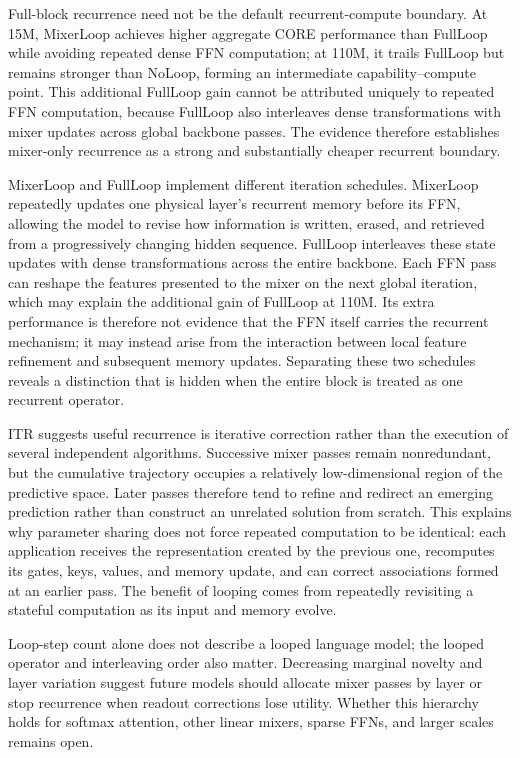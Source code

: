 \documentclass{article}
\begin{document}
Full-block recurrence need not be the default recurrent-compute boundary. At
15M, MixerLoop achieves higher aggregate CORE performance than FullLoop while
avoiding repeated dense FFN computation; at 110M, it trails FullLoop but remains
stronger than NoLoop, forming an intermediate capability--compute point. This
additional FullLoop gain cannot be attributed uniquely to repeated FFN
computation, because FullLoop also interleaves dense transformations with mixer
updates across global backbone passes. The evidence therefore establishes
mixer-only recurrence as a strong and substantially cheaper recurrent boundary.

MixerLoop and FullLoop implement different iteration schedules. MixerLoop
repeatedly updates one physical layer's recurrent memory before its FFN,
allowing the model to revise how information is written, erased, and retrieved
from a progressively changing hidden sequence. FullLoop interleaves these state
updates with dense transformations across the entire backbone. Each FFN pass can
reshape the features presented to the mixer on the next global iteration, which
may explain the additional gain of FullLoop at 110M. Its extra performance is
therefore not evidence that the FFN itself carries the recurrent mechanism; it
may instead arise from the interaction between local feature refinement and
subsequent memory updates. Separating these two schedules reveals a distinction
that is hidden when the entire block is treated as one recurrent operator.

ITR suggests useful recurrence is iterative correction rather than the execution
of several independent algorithms. Successive mixer passes remain
nonredundant, but the cumulative trajectory occupies a relatively
low-dimensional region of the predictive space. Later passes therefore tend to
refine and redirect an emerging prediction rather than construct an unrelated
solution from scratch. This explains why parameter sharing does not force
repeated computation to be identical: each application receives the
representation created by the previous one, recomputes its gates, keys, values,
and memory update, and can correct associations formed at an earlier pass. The
benefit of looping comes from repeatedly revisiting a stateful computation as
its input and memory evolve.

Loop-step count alone does not describe a looped language model; the looped
operator and interleaving order also matter. Decreasing marginal novelty and
layer variation suggest future models should allocate mixer passes by layer or
stop recurrence when readout corrections lose utility. Whether this hierarchy
holds for softmax attention, other linear mixers, sparse FFNs, and larger scales
remains open.
\end{document}
